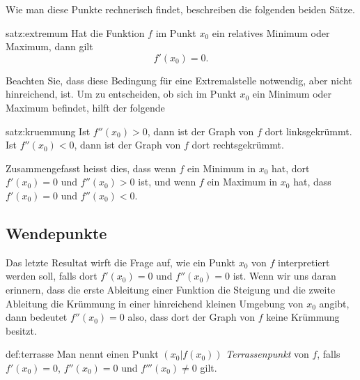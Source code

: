 \documentclass[%
11pt,%
twoside,%
titlepage,%
german,%
headsepline%
]{scrartcl}
\begin{document}
\clearpage

Wie man diese Punkte rechnerisch findet, beschreiben die folgenden beiden S\"atze.
\begin{csatz}{satz:extremum}
Hat
die Funktion $f$ im Punkt $x_0$ ein relatives Minimum oder Maximum, dann gilt
$$f'(x_0)=0.$$
\end{csatz}
Beachten Sie, dass diese Bedingung f\"ur eine Extremalstelle notwendig, aber nicht hinreichend, ist. Um zu entscheiden, ob sich im Punkt $x_0$ ein Minimum oder Maximum befindet, hilft der folgende
\begin{csatz}{satz:kruemmung}
Ist $f''(x_0)>0$, dann ist der Graph von $f$ dort linksgekr\"ummt. Ist $f''(x_0)<0$, dann ist der Graph von $f$ dort rechtsgekr\"ummt.
\end{csatz}
Zusammengefasst heisst dies, dass wenn $f$ ein Minimum in $x_0$ hat, dort $f'(x_0)=0$ und $f''(x_0)>0$ ist, und wenn $f$ ein Maximum in $x_0$ hat, dass $f'(x_0)=0$ und $f''(x_0)<0$.

\subsection{Wendepunkte}
Das letzte Resultat wirft die Frage auf, wie ein Punkt $x_0$ von $f$ interpretiert werden soll, falls dort $f'(x_0)=0$ und $f''(x_0)=0$ ist. Wenn wir uns daran erinnern, dass die erste Ableitung einer Funktion die Steigung und die zweite Ableitung die Kr\"ummung in einer hinreichend kleinen Umgebung von $x_0$ angibt, dann bedeutet $f''(x_0)=0$ also, dass dort der Graph von $f$ keine Kr\"ummung besitzt.

\begin{cdef}[Terrassenpunkt]{def:terrasse}
Man nennt einen Punkt $(x_0|f(x_0))$ \emph{Terrassenpunkt} von $f$, falls $f'(x_0)=0$, $f''(x_0)=0$ und $f'''(x_0)\neq0$ gilt.
\end{cdef}
\end{document}
